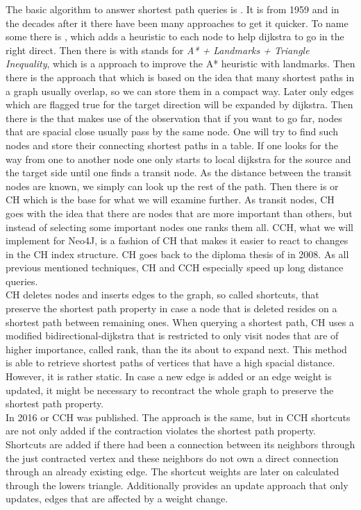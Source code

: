 The basic algorithm to answer shortest path queries is \cite[dijkstra]{Dijkstra_1959}.
It is from 1959 and in the decades after it there have been many approaches to get it quicker.
To name some there is \cite[A*]{A_Star}, which adds a heuristic to each node to help dijkstra to go in the right direct.
Then there is \cite[ALT]{ALT} with stands for \textit{A* + Landmarks + Triangle Inequality}, which is a approach to improve the A* heuristic with landmarks.
Then there is the \cite[Arc Flag]{ARC_FLAG} approach that which is based on the idea that many shortest paths in a graph usually overlap, so we can store them in a compact way.
Later only edges which are flagged true for the target direction will be expanded by dijkstra.
Then there is the \cite[Transit-Node]{Bast_2007} that makes use of the observation that if you want to go far, nodes that are spacial close usually pass by the same node.
One will try to find such nodes and store their connecting shortest paths in a table.
If one looks for the way from one to another node one only starts to local dijkstra for the source and the target side until one finds a transit node.
As the distance between the transit nodes are known, we simply can look up the rest of the path.
Then there is \cite[Contraction Hierarchies]{Geisberger_2012} or CH which is the base for what we will examine further.
As transit nodes, CH goes with the idea that there are nodes that are more important than others, but instead of selecting some important nodes one ranks them all.
CCH, what we will implement for Neo4J, is a fashion of CH that makes it easier to react to changes in the CH index structure.
CH goes back to the diploma thesis of \cite[Geisberger]{Geisberger} in 2008.
As all previous mentioned techniques, CH and CCH especially speed up long distance queries.
\\ 
CH deletes nodes and inserts edges to the graph, so called shortcuts, that preserve the shortest path property in case a node that is deleted resides on a shortest path between remaining ones.
When querying a shortest path, CH uses a modified bidirectional-dijkstra that is restricted to only visit nodes that are of higher importance, called rank, than the its about to expand next.
This method is able to retrieve shortest paths of vertices that have a high spacial distance.
However, it is rather static.
In case a new edge is added or an edge weight is updated, it might be necessary to recontract the whole graph to preserve the shortest path property.
\\
In 2016 \cite[Customization Contraction Hierarchies]{CCH} or CCH was published.
The approach is the same, but in CCH shortcuts are not only added if the contraction violates the shortest path property.
Shortcuts are added if there had been a connection between its neighbors through the just contracted vertex and these neighbors do not own a direct connection through an already existing edge.
The shortcut weights are later on calculated through the lowers triangle.
Additionally \cite[Customization Contraction Hierarchies]{CCH} provides an update approach that only updates,
edges that are affected by a weight change.



